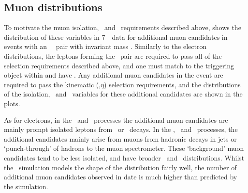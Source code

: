 
\subsection{Muon distributions}

To motivate the muon isolation, \dzerosig\ and \zzero\ requirements described
above,  shows the distribution of these variables in 7~\tev\ data for additional
muon candidates in events with an \ossf\ \dilepton\ pair with invariant mass \sstooos.
Similarly to the electron distributions, the leptons forming the \dilepton\ pair are required to pass all of
the selection requirements described above, and one must match to the triggering
object within  and have . Any additional muon candidates in the event are required to pass
the kinematic (\pt,$\eta$) selection requirements, and the distributions of the isolation, \dzerosig\ and \zzero\
variables for these additional candidates are shown in the plots. 

As for electrons, in the \WZ\ and \ZZ\ processes the additional muon candidates 
are mainly prompt isolated leptons from \W\ or \Z\ decays. In the \Zll,
\ttbar\ and \WW\ processes, the additional candidates mainly arise from muons from
hadronic decays in jets or `punch-through' of hadrons to the muon spectrometer.
These `background' muon candidates tend to be less isolated, and have broader \dzerosig\
and \zzero\ distributions. Whilst the \mc\ simulation models the shape of the distribution
fairly well, the number of additional muon candidates observed in date is much higher than
predicted by the simulation.

